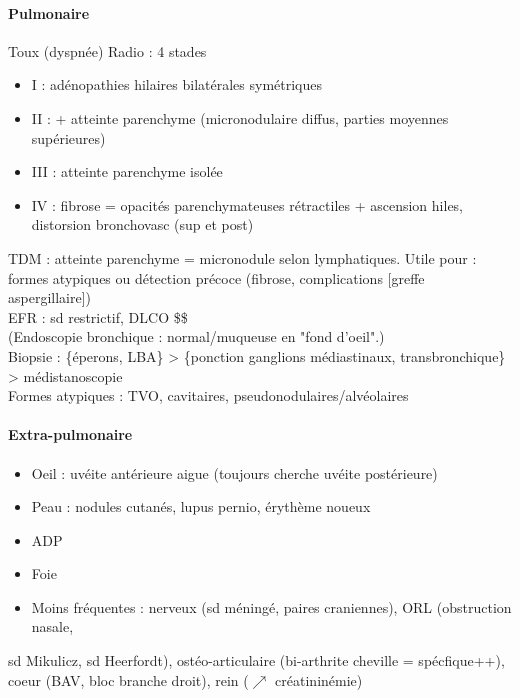 \documentclass[11pt]{article}
\begin{document}
\paragraph{Pulmonaire}
\label{sec:org1520fbd}
\label{sec:org4ec1d7e}
Toux (dyspnée)
Radio : 4 stades

\begin{itemize}
\item I : adénopathies hilaires bilatérales symétriques
\item II : + atteinte parenchyme (micronodulaire diffus, parties moyennes supérieures)
\item III : atteinte parenchyme isolée
\item IV : fibrose = opacités parenchymateuses rétractiles + ascension hiles, distorsion bronchovasc (sup et post)
\end{itemize}

TDM : atteinte parenchyme = micronodule selon lymphatiques. Utile pour : formes atypiques ou détection précoce (fibrose, complications [greffe aspergillaire])\\
EFR : sd restrictif, DLCO \$\searrow\$\\
(Endoscopie bronchique : normal/muqueuse en "fond d'oeil".)\\
Biopsie : \{éperons, LBA\} > \{ponction ganglions médiastinaux, transbronchique\} > médistanoscopie\\
Formes atypiques : TVO, cavitaires, pseudonodulaires/alvéolaires

\paragraph{Extra-pulmonaire}
\label{sec:org2391273}
\label{sec:org316c190}

\begin{itemize}
\item Oeil : uvéite antérieure aigue (toujours cherche uvéite postérieure)
\item Peau : nodules cutanés, lupus pernio, érythème noueux
\item ADP
\item Foie
\item Moins fréquentes : nerveux (sd méningé, paires craniennes), ORL (obstruction
nasale,
\end{itemize}

sd Mikulicz, sd Heerfordt), ostéo-articulaire (bi-arthrite cheville =
spécfique++), 
coeur (BAV, bloc branche droit), rein (\(\nearrow\) créatininémie)
\end{document}
